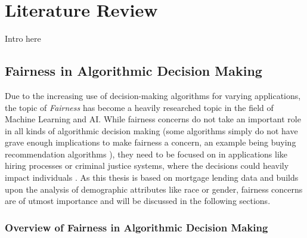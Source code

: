 \chapter{Literature Review}\label{chap:lit}

Intro here

\section{Fairness in Algorithmic Decision Making}\label{sec:fairness}

Due to the increasing use of decision-making algorithms for varying applications, the topic of \textit{Fairness} has become a heavily researched topic in the field of Machine Learning and AI.\@
While fairness concerns do not take an important role in all kinds of algorithmic decision making (some algorithms simply do not have grave enough implications to make fairness a concern, an example being buying recommendation algorithms \parencite{Marcinkevics2023}), 
they need to be focused on in applications like hiring processes or criminal justice systems, where the decisions could heavily impact individuals \parencite{Barocas2016}.
As this thesis is based on mortgage lending data and builds upon the analysis of demographic attributes like race or gender, fairness concerns are of utmost importance and will be discussed in the following sections.

\subsection{Overview of Fairness in Algorithmic Decision Making}\label{subsec:overview}

